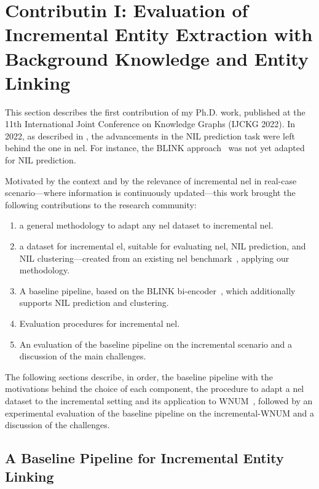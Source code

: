 \section{Contributin I: Evaluation of Incremental Entity Extraction with Background
Knowledge and Entity Linking}

This section describes the first contribution of my Ph.D. work, published at the 11th International Joint Conference on Knowledge Graphs
(IJCKG 2022). In 2022, as described in , the advancements in the NIL prediction task were left behind the one in \ac{nel}. For instance, the BLINK approach~\cite{blink} was not yet adapted for NIL prediction.

Motivated by the context and by the relevance of incremental \ac{nel} in real-case scenario---where information is continuously updated---this work brought the following contributions to the research community: 
\begin{enumerate}
    \item a general methodology to adapt any \ac{nel} dataset to incremental \ac{nel}.
    \item a dataset for incremental \ac{el}, suitable for evaluating \ac{nel}, NIL prediction, and NIL clustering---created from an existing \ac{nel} benchmark~\cite{Onoe_Durrett_2020}, applying our methodology.
    \item A baseline pipeline, based on the BLINK bi-encoder~\cite{blink}, which additionally supports NIL prediction and clustering.
    \item Evaluation procedures for incremental \ac{nel}.
    \item An evaluation of the baseline pipeline on the incremental scenario and a discussion of the main challenges.
\end{enumerate}

The following sections describe, in order, the baseline pipeline with the motivations behind the choice of each component, the procedure to adapt a \ac{nel} dataset to the incremental setting and its application to WNUM~\cite{Onoe_Durrett_2020}, followed by an experimental evaluation of the baseline pipeline on the incremental-WNUM and a discussion of the challenges.

\subsection{A Baseline Pipeline for Incremental Entity Linking}

